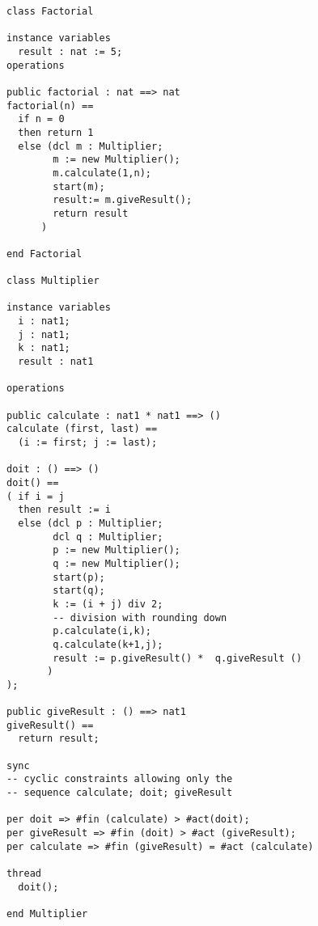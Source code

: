 \documentclass{overturerepchap}
\begin{document}
{\begin{description}
\begin{lstlisting}
class Factorial

instance variables
  result : nat := 5;
operations

public factorial : nat ==> nat
factorial(n) ==
  if n = 0
  then return 1
  else (dcl m : Multiplier;
        m := new Multiplier();
        m.calculate(1,n);
        start(m);
        result:= m.giveResult();
        return result
      )

end Factorial

class Multiplier

instance variables
  i : nat1;
  j : nat1;
  k : nat1;
  result : nat1

operations

public calculate : nat1 * nat1 ==> ()
calculate (first, last) ==
  (i := first; j := last);

doit : () ==> ()
doit() ==
( if i = j
  then result := i
  else (dcl p : Multiplier;
        dcl q : Multiplier;
        p := new Multiplier();
        q := new Multiplier();
        start(p);
        start(q);
        k := (i + j) div 2;
        -- division with rounding down
        p.calculate(i,k);
        q.calculate(k+1,j);
        result := p.giveResult() *  q.giveResult ()
       )
);

public giveResult : () ==> nat1
giveResult() ==
  return result;

sync
-- cyclic constraints allowing only the
-- sequence calculate; doit; giveResult

per doit => #fin (calculate) > #act(doit);
per giveResult => #fin (doit) > #act (giveResult);
per calculate => #fin (giveResult) = #act (calculate)

thread
  doit();

end Multiplier
\end{lstlisting}




\end{description}}
\end{document}
